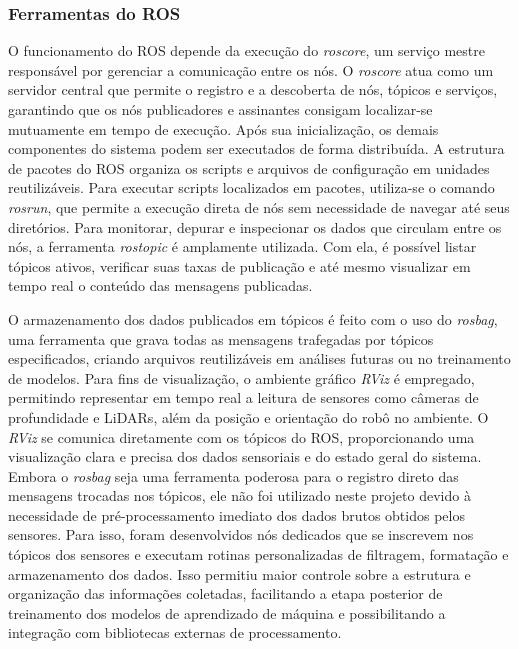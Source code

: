\subsubsection{Ferramentas do ROS}

O funcionamento do ROS depende da execução do \textit{roscore}, um serviço mestre responsável por gerenciar a comunicação entre os nós. O \textit{roscore} atua como um servidor central que permite o registro e a descoberta de nós, tópicos e serviços, garantindo que os nós publicadores e assinantes consigam localizar-se mutuamente em tempo de execução. Após sua inicialização, os demais componentes do sistema podem ser executados de forma distribuída. A estrutura de pacotes do ROS organiza os scripts e arquivos de configuração em unidades reutilizáveis. Para executar scripts localizados em pacotes, utiliza-se o comando \textit{rosrun}, que permite a execução direta de nós sem necessidade de navegar até seus diretórios. Para monitorar, depurar e inspecionar os dados que circulam entre os nós, a ferramenta \textit{rostopic} é amplamente utilizada. Com ela, é possível listar tópicos ativos, verificar suas taxas de publicação e até mesmo visualizar em tempo real o conteúdo das mensagens publicadas.

O armazenamento dos dados publicados em tópicos é feito com o uso do \textit{rosbag}, uma ferramenta que grava todas as mensagens trafegadas por tópicos especificados, criando arquivos reutilizáveis em análises futuras ou no treinamento de modelos. Para fins de visualização, o ambiente gráfico \textit{RViz} é empregado, permitindo representar em tempo real a leitura de sensores como câmeras de profundidade e LiDARs, além da posição e orientação do robô no ambiente. O \textit{RViz} se comunica diretamente com os tópicos do ROS, proporcionando uma visualização clara e precisa dos dados sensoriais e do estado geral do sistema. Embora o \textit{rosbag} seja uma ferramenta poderosa para o registro direto das mensagens trocadas nos tópicos, ele não foi utilizado neste projeto devido à necessidade de pré-processamento imediato dos dados brutos obtidos pelos sensores. Para isso, foram desenvolvidos nós dedicados que se inscrevem nos tópicos dos sensores e executam rotinas personalizadas de filtragem, formatação e armazenamento dos dados. Isso permitiu maior controle sobre a estrutura e organização das informações coletadas, facilitando a etapa posterior de treinamento dos modelos de aprendizado de máquina e possibilitando a integração com bibliotecas externas de processamento.

